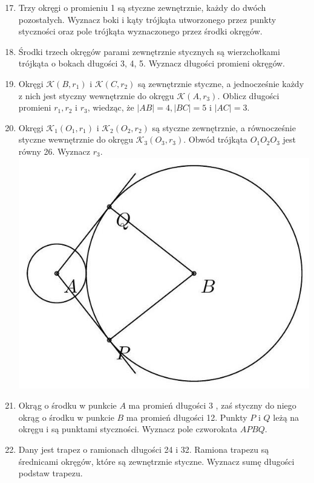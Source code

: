 \documentclass[10pt]{article}
\begin{document}
\begin{enumerate}
  \setcounter{enumi}{16}
  \item Trzy okręgi o promieniu 1 są styczne zewnętrznie, każdy do dwóch pozostałych. Wyznacz boki i kąty trójkąta utworzonego przez punkty styczności oraz pole trójkąta wyznaczonego przez środki okręgów.
  \item Środki trzech okręgów parami zewnętrznie stycznych są wierzchołkami trójkąta o bokach długości 3, 4, 5. Wyznacz długości promieni okręgów.
  \item Okręgi \(\mathcal{K}\left(B, r_{1}\right)\) i \(\mathcal{K}\left(C, r_{2}\right)\) są zewnętrznie styczne, a jednocześnie każdy z nich jest styczny wewnętrznie do okręgu \(\mathcal{K}\left(A, r_{3}\right)\). Oblicz długości promieni \(r_{1}, r_{2}\) i \(r_{3}\), wiedząc, że \(|A B|=4,|B C|=5\) i \(|A C|=3\).
  \item Okręgi \(\mathcal{K}_{1}\left(O_{1}, r_{1}\right)\) i \(\mathcal{K}_{2}\left(O_{2}, r_{2}\right)\) są styczne zewnętrznie, a równocześnie styczne wewnętrznie do okręgu \(\mathcal{K}_{3}\left(O_{3}, r_{3}\right)\). Obwód trójkąta \(O_{1} O_{2} O_{3}\) jest równy 26. Wyznacz \(r_{3}\).\\
\includegraphics[max width=\textwidth, center]{2024_11_21_e9b4faa005d5be2cc318g-036(1)}
  \item Okrąg o środku w punkcie \(A\) ma promień długości 3 , zaś styczny do niego okrąg o środku w punkcie \(B\) ma promień długości 12. Punkty \(P\) i \(Q\) leżą na okręgu i są punktami styczności. Wyznacz pole czworokata \(A P B Q\).
  \item Dany jest trapez o ramionach długości 24 i 32. Ramiona trapezu są średnicami okręgów, które są zewnętrznie styczne. Wyznacz sumę długości podstaw trapezu.

\end{enumerate}
\end{document}
